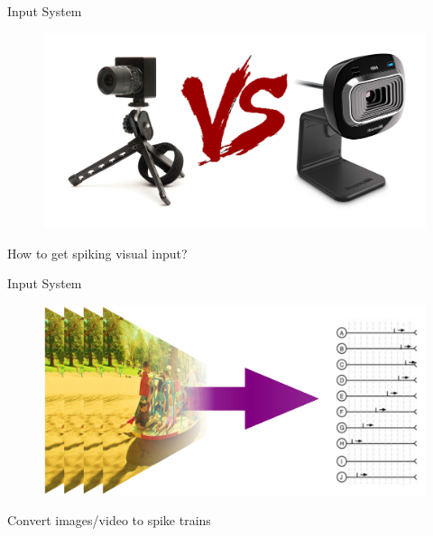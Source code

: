 \documentclass[17pt,mathserif]{beamer}
\begin{document}
    \begin{frame}{Input System}
      \vspace*{-3em}
      \begin{figure}
        \includegraphics[width=\textwidth]{./dvs-vs-cam}
      \end{figure}
      \vspace*{-0.8em}
      \hspace*{0.05\textwidth}
      \begin{minipage}{0.9\textwidth}
        \centering \small How to get spiking visual input?
      \end{minipage}
    \end{frame}

    \begin{frame}{Input System}
        \vspace*{-4em}
        \begin{figure}
            \includegraphics[scale=0.3]{./images-to-spikes}
        \end{figure}
        \vspace*{-0.4em}
        \hspace*{0.05\textwidth}
        \begin{minipage}{0.9\textwidth}
          \centering \small Convert images/video to spike trains
        \end{minipage}
    \end{frame}
    
\end{document}

